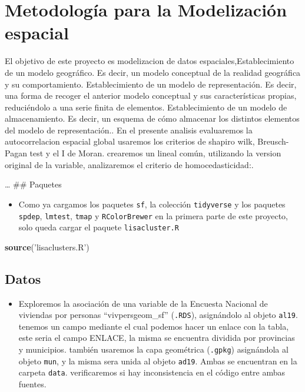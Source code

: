 \documentclass[11pt,]{article}
\newenvironment{Shaded}{\begin{snugshade}}{\end{snugshade}}
\newcommand{\KeywordTok}[1]{\textcolor[rgb]{0.13,0.29,0.53}{\textbf{#1}}}
\newcommand{\StringTok}[1]{\textcolor[rgb]{0.31,0.60,0.02}{#1}}
\newcommand{\NormalTok}[1]{#1}
\providecommand{\tightlist}{%
\setlength{\itemsep}{0pt}\setlength{\parskip}{0pt}}
\begin{document}
\section{Metodología para la Modelización
espacial}\label{metodologuxeda-para-la-modelizaciuxf3n-espacial}

El objetivo de este proyecto es modelizacion de datos
espaciales,Establecimiento de un modelo geográfico. Es decir, un modelo
conceptual de la realidad geográfica y su comportamiento.
Establecimiento de un modelo de representación. Es decir, una forma de
recoger el anterior modelo conceptual y sus características propias,
reduciéndolo a una serie finita de elementos. Establecimiento de un
modelo de almacenamiento. Es decir, un esquema de cómo almacenar los
distintos elementos del modelo de representación.. En el presente
analisis evaluaremos la autocorrelacion espacial global usaremos los
criterios de shapiro wilk, Breusch-Pagan test y el I de Moran. crearemos
un lineal común, utilizando la version original de la variable,
analizaremos el criterio de homocedasticidad:.

\ldots
\#\# Paquetes

\begin{itemize}
\tightlist
\item
  Como ya cargamos los paquetes \texttt{sf}, la colección
  \texttt{tidyverse} y los paquetes \texttt{spdep}, \texttt{lmtest},
  \texttt{tmap} y \texttt{RColorBrewer} en la primera parte de este
  proyecto, solo queda cargar el paquete \texttt{lisacluster.R}
\end{itemize}

\begin{Shaded}
\begin{Highlighting}[]
\KeywordTok{source}\NormalTok{(}\StringTok{'lisaclusters.R'}\NormalTok{)}
\end{Highlighting}
\end{Shaded}

\subsection{Datos}\label{datos-1}

\begin{itemize}
\tightlist
\item
  Exploremos la asociación de una variable de la Encuesta Nacional de
  viviendas por personas ``vivpersgeom\_sf'' (\texttt{.RDS}),
  asignándolo al objeto \texttt{al19}. tenemos un campo mediante el cual
  podemos hacer un enlace con la tabla, este seria el campo ENLACE, la
  misma se encuentra dividida por provincias y municipios. también
  usaremos la capa geométrica (\texttt{.gpkg}) asignándola al objeto
  \texttt{mun}, y la misma sera unida al objeto \texttt{ad19}. Ambas se
  encuentran en la carpeta \texttt{data}. verificaremos si hay
  inconsistencia en el código entre ambas fuentes.
\end{itemize}
\end{document}
